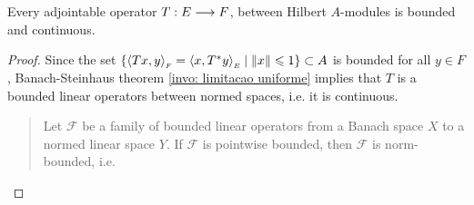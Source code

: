 \begin{proposicao}
    Every adjointable operator $T:E \longrightarrow F$, between Hilbert $A$-modules is bounded and continuous.
     \begin{proof}
         Since the set $\{\sub{\inner{Tx}y}F = \sub{\inner{x}{T^*y}}E \mid \|x\|\leq 1\} \subset A$ is bounded for all $y \in F$, Banach-Steinhaus theorem \ref{invo: limitacao uniforme} implies that $T$ is a bounded linear operators between normed spaces, i.e. it is continuous. \qedhere
         \begin{quote}
             \begin{invocacao}
         \label{invo: limitacao uniforme}
         Let $\mathcal{F}$ be a family of bounded linear operators from a Banach space $X$ to a normed linear space $Y$. If $\mathcal{F}$ is pointwise bounded, then $\mathcal{F}$ is norm-bounded, i.e.


\end{invocacao}
\end{quote}
\end{proof}
\end{proposicao}
